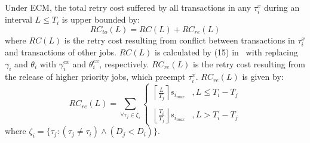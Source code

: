 \begin{clm}\label{ecm rlease conflict}
Under ECM, the total retry cost suffered by all transactions in any $\tau_i^x$ during an interval $L\le T_i$ is upper bounded by:
\begin{equation}
RC_{to}(L)=RC(L)+RC_{re}(L)
\label{total rc ecm eq}
\end{equation}
%
where $RC(L)$ is the retry cost resulting from conflict between transactions in $\tau_i^x$ and transactions of other jobs. $RC(L)$ is calculated by (15) in~\cite{stmconcurrencycontrol:emsoft11} with replacing $\gamma_i$ and $\theta_i$ with $\gamma_i^{ex}$ and $\theta_i^{ex}$, respectively. $RC_{re}(L)$ is the retry cost resulting from the release of higher priority jobs, which preempt $\tau_i^x$. $RC_{re}(L)$ is given by:
\begin{equation}
RC_{re}(L)=\sum_{\forall \tau_{j}\in\zeta_{i}}\begin{cases}
\left\lceil \frac{L}{T_{j}}\right\rceil s_{i_{max}} & ,L\le T_{i}-T_{j}\\\\
\left\lfloor \frac{T_{i}}{T_{j}}\right\rfloor s_{i_{max}} & ,L>T_{i}-T_{j}
\end{cases}\label{eq6}
\end{equation}
%
where $\zeta_i=\{\tau_j:\left(\tau_j \ne \tau_i\right)\wedge \left(D_j < D_i \right)\}$.
\end{clm}
